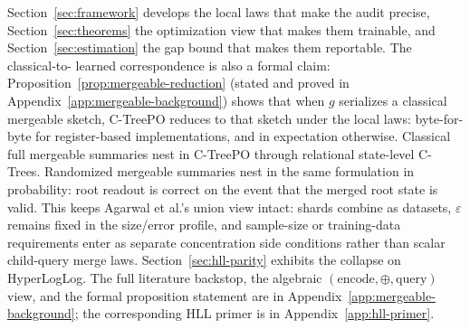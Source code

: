Section~\ref{sec:framework} develops the local laws that make the
audit precise, Section~\ref{sec:theorems} the optimization view that
makes them trainable, and Section~\ref{sec:estimation} the gap bound
that makes them reportable. The classical-to-
learned correspondence is also a formal claim:
Proposition~\ref{prop:mergeable-reduction} (stated and proved in
Appendix~\ref{app:mergeable-background}) shows that when $g$ serializes
a classical mergeable sketch, C-TreePO reduces to that sketch under the
local laws: byte-for-byte for register-based implementations, and in
expectation otherwise. Classical full mergeable summaries nest in C-TreePO
through relational state-level C-Trees. Randomized mergeable summaries nest in
the same formulation in probability: root readout is correct on the event that
the merged root state is valid. This keeps Agarwal et al.'s union view intact:
shards combine as datasets, $\varepsilon$ remains fixed in the size/error
profile, and sample-size or training-data requirements enter as separate
concentration side conditions rather than scalar child-query merge laws.
Section~\ref{sec:hll-parity} exhibits the
collapse on HyperLogLog. The full literature backstop, the algebraic
$(\mathrm{encode}, \oplus, \mathrm{query})$ view, and the formal
proposition statement are in
Appendix~\ref{app:mergeable-background}; the corresponding HLL primer
is in Appendix~\ref{app:hll-primer}.
